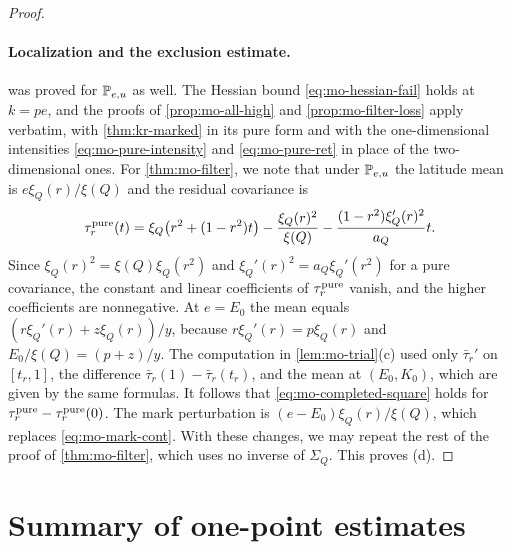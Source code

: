 \begin{proof}
\paragraph{Localization and the exclusion estimate.}
 was proved for $\mathbb P_{e,u}$ as well. The Hessian bound \eqref{eq:mo-hessian-fail} holds at $k=pe$, and the proofs of \cref{prop:mo-all-high} and \cref{prop:mo-filter-loss} apply verbatim, with \cref{thm:kr-marked} in its pure form and with the one-dimensional intensities \eqref{eq:mo-pure-intensity} and \eqref{eq:mo-pure-ret} in place of the two-dimensional ones. For \cref{thm:mo-filter}, we note that under $\mathbb P_{e,u}$ the latitude mean is $e\xi_Q(r)/\xi(Q)$ and the residual covariance is
\[
\tau^{\rm pure}_r(t)=\xi_Q\bigl(r^2+(1-r^2)t\bigr)-\frac{\xi_Q(r)^2}{\xi(Q)}-\frac{(1-r^2)\xi_Q'(r)^2}{a_Q}t.
\]
Since $\xi_Q(r)^2=\xi(Q)\xi_Q(r^2)$ and $\xi_Q'(r)^2=a_Q\xi_Q'(r^2)$ for a pure covariance, the constant and linear coefficients of $\tau^{\rm pure}_r$ vanish, and the higher coefficients are nonnegative. At $e=E_0$ the mean equals $(r\xi_Q'(r)+z\xi_Q(r))/y$, because $r\xi_Q'(r)=p\xi_Q(r)$ and $E_0/\xi(Q)=(p+z)/y$. The computation in \cref{lem:mo-trial}(c) used only $\bar\tau_r'$ on $[t_r,1]$, the difference $\bar\tau_r(1)-\bar\tau_r(t_r)$, and the mean at $(E_0,K_0)$, which are given by the same formulas. It follows that \eqref{eq:mo-completed-square} holds for $\tau^{\rm pure}_r-\tau^{\rm pure}_r(0)$. The mark perturbation is $(e-E_0)\xi_Q(r)/\xi(Q)$, which replaces \eqref{eq:mo-mark-cont}. With these changes, we may repeat the rest of the proof of \cref{thm:mo-filter}, which uses no inverse of $\Sigma_Q$. This proves (d).
\end{proof}


\section{Summary of one-point estimates}\label{sec:mo-interface}

